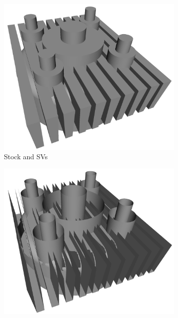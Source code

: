\begin{figure}
	\centering
	\begin{subfigure}[t]{0.32\textwidth}
		\centering
		\includegraphics[width=\textwidth]{images/cylinder_head_stock_and_svs}
		\caption{Stock and SVs}
		\label{fig:cylinder_head_stock_sv}
	\end{subfigure}
	\begin{subfigure}[t]{0.32\textwidth}
		\centering
		\includegraphics[width=\textwidth]{images/cylinder_head_vml}

\end{subfigure}
\end{figure}
